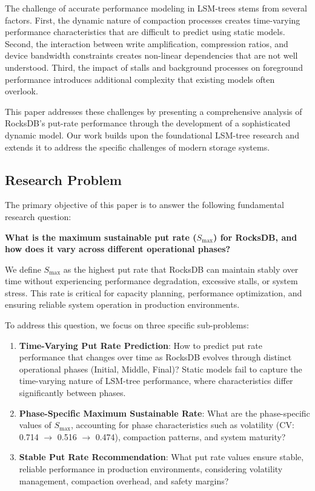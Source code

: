\documentclass[11pt]{article}
\begin{document}
The challenge of accurate performance modeling in LSM-trees stems from several factors. First, the dynamic nature of compaction processes creates time-varying performance characteristics that are difficult to predict using static models. Second, the interaction between write amplification, compression ratios, and device bandwidth constraints creates non-linear dependencies that are not well understood. Third, the impact of stalls and background processes on foreground performance introduces additional complexity that existing models often overlook.

This paper addresses these challenges by presenting a comprehensive analysis of RocksDB's put-rate performance through the development of a sophisticated dynamic model. Our work builds upon the foundational LSM-tree research and extends it to address the specific challenges of modern storage systems.

\subsection{Research Problem}

The primary objective of this paper is to answer the following fundamental research question:

\textbf{What is the maximum sustainable put rate ($S_{\max}$) for RocksDB, and how does it vary across different operational phases?}

We define $S_{\max}$ as the highest put rate that RocksDB can maintain stably over time without experiencing performance degradation, excessive stalls, or system stress. This rate is critical for capacity planning, performance optimization, and ensuring reliable system operation in production environments.

To address this question, we focus on three specific sub-problems:

\begin{enumerate}
    \item \textbf{Time-Varying Put Rate Prediction}: How to predict put rate performance that changes over time as RocksDB evolves through distinct operational phases (Initial, Middle, Final)? Static models fail to capture the time-varying nature of LSM-tree performance, where characteristics differ significantly between phases.
    
    \item \textbf{Phase-Specific Maximum Sustainable Rate}: What are the phase-specific values of $S_{\max}$, accounting for phase characteristics such as volatility (CV: 0.714 $\rightarrow$ 0.516 $\rightarrow$ 0.474), compaction patterns, and system maturity?
    
    \item \textbf{Stable Put Rate Recommendation}: What put rate values ensure stable, reliable performance in production environments, considering volatility management, compaction overhead, and safety margins?
\end{enumerate}
\end{document}
